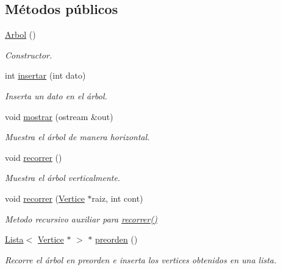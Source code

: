 \subsection*{Métodos públicos}
\begin{DoxyCompactItemize}
\item 
\mbox{\label{classArbol_a4f5d3e25a0e1a40cb09cefa39378b7be}} 
\hyperlink{classArbol_a4f5d3e25a0e1a40cb09cefa39378b7be}{Arbol} ()
\begin{DoxyCompactList}\small\item\em Constructor. \end{DoxyCompactList}\item 
int \hyperlink{classArbol_af332559b5f9d894ecc6a707bb1550ae2}{insertar} (int dato)
\begin{DoxyCompactList}\small\item\em Inserta un dato en el árbol. \end{DoxyCompactList}\item 
void \hyperlink{classArbol_a61749974f55056420f4e5a76eb664809}{mostrar} (ostream \&out)
\begin{DoxyCompactList}\small\item\em Muestra el árbol de manera horizontal. \end{DoxyCompactList}\item 
\mbox{\label{classArbol_a5bd356760f63521e8578a83613aa4792}} 
void \hyperlink{classArbol_a5bd356760f63521e8578a83613aa4792}{recorrer} ()
\begin{DoxyCompactList}\small\item\em Muestra el árbol verticalmente. \end{DoxyCompactList}\item 
void \hyperlink{classArbol_a0ae46c572d300cd4a5f27b7d00a1a14e}{recorrer} (\hyperlink{classVertice}{Vertice} $\ast$raiz, int cont)
\begin{DoxyCompactList}\small\item\em Metodo recursivo auxiliar para \hyperlink{classArbol_a5bd356760f63521e8578a83613aa4792}{recorrer()} \end{DoxyCompactList}\item 
\hyperlink{classLista}{Lista}$<$ \hyperlink{classVertice}{Vertice} $\ast$ $>$ $\ast$ \hyperlink{classArbol_a0ffdc60ce8f2267366681cc94cf6beea}{preorden} ()
\begin{DoxyCompactList}\small\item\em Recorre el árbol en preorden e inserta los vertices obtenidos en una lista. \end{DoxyCompactList}\item 

\end{DoxyCompactItemize}
